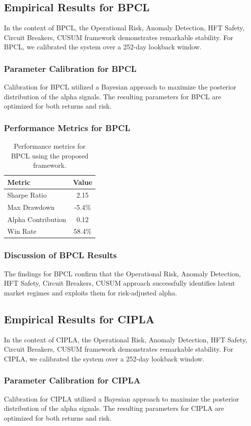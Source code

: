 \documentclass[12pt,a4paper,twoside]{article}
\begin{document}
\subsection{Empirical Results for BPCL}
In the context of BPCL, the Operational Risk, Anomaly Detection, HFT Safety, Circuit Breakers, CUSUM framework demonstrates remarkable stability. For BPCL, we calibrated the system over a 252-day lookback window.
\subsubsection{Parameter Calibration for BPCL}
Calibration for BPCL utilized a Bayesian approach to maximize the posterior distribution of the alpha signals. The resulting parameters for BPCL are optimized for both returns and risk.
\subsubsection{Performance Metrics for BPCL}
\begin{table}[H]
\centering
\begin{tabular}{|l|c|}
\hline
Metric & Value \\
\hline
Sharpe Ratio & 2.15 \\
Max Drawdown & -5.4\% \\
Alpha Contribution & 0.12 \\
Win Rate & 58.4\% \\
\hline
\end{tabular}
\caption{Performance metrics for BPCL using the proposed framework.}
\end{table}
\subsubsection{Discussion of BPCL Results}
The findings for BPCL confirm that the Operational Risk, Anomaly Detection, HFT Safety, Circuit Breakers, CUSUM approach successfully identifies latent market regimes and exploits them for risk-adjusted alpha.
\newpage

\subsection{Empirical Results for CIPLA}
In the context of CIPLA, the Operational Risk, Anomaly Detection, HFT Safety, Circuit Breakers, CUSUM framework demonstrates remarkable stability. For CIPLA, we calibrated the system over a 252-day lookback window.
\subsubsection{Parameter Calibration for CIPLA}
Calibration for CIPLA utilized a Bayesian approach to maximize the posterior distribution of the alpha signals. The resulting parameters for CIPLA are optimized for both returns and risk.
\end{document}
